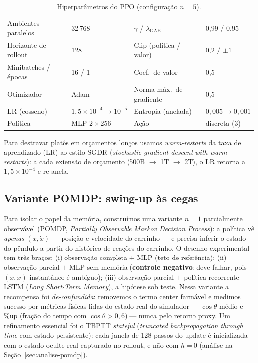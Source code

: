 \documentclass[12pt]{article}
\begin{document}
\begin{table}[ht]
\centering
\caption{Hiperparâmetros do PPO (configuração $n{=}5$).}
\label{tab:hparams}
\small
\begin{tabular}{ll@{\qquad}ll}
\toprule
Ambientes paralelos & 32\,768 & $\gamma$ / $\lambda_{\mathrm{GAE}}$ & 0,99 / 0,95\\
Horizonte de rollout & 128 & Clip (política / valor) & 0,2 / $\pm 1$\\
Minibatches / épocas & 16 / 1 & Coef.\ de valor & 0,5\\
Otimizador & Adam & Norma máx.\ de gradiente & 0,5\\
LR (cosseno) & $1{,}5\times10^{-4} \to 10^{-5}$ & Entropia (anelada) & $0{,}005 \to 0{,}001$\\
Política & MLP $2\times256$ & Ação & discreta (3)\\
\bottomrule
\end{tabular}
\end{table}

Para destravar platôs em orçamentos longos usamos \emph{warm-restarts} da taxa
de aprendizado (LR) ao estilo SGDR (\emph{stochastic gradient descent with
warm restarts}): a cada extensão de orçamento (500B $\to$ 1T $\to$ 2T), o LR
retorna a $1{,}5\times10^{-4}$ e re-anela.

\subsection{Variante POMDP: swing-up às cegas}\label{sec:pomdp-metodo}

Para isolar o papel da memória, construímos uma variante $n{=}1$ parcialmente
observável (POMDP, \emph{Partially Observable Markov Decision
Process}): a política vê \emph{apenas} $(x, \dot{x})$ --- posição e
velocidade do carrinho --- e precisa inferir o estado do pêndulo a partir do
histórico de reações do carrinho. O desenho experimental tem três braços:
(i) observação completa $+$ MLP (teto de referência); (ii) observação parcial
$+$ MLP sem memória (\textbf{controle negativo}: deve falhar, pois
$(x,\dot{x})$ instantâneo é ambíguo); (iii) observação parcial $+$ política
recorrente LSTM (\emph{Long Short-Term Memory}), a hipótese sob teste. Nessa variante a recompensa foi
\emph{de-confundida}: removemos o termo $\mathrm{center}$ farmável e medimos
sucesso por métricas físicas lidas do estado real do simulador ---
$\cos\theta$ médio e \%up (fração do tempo com $\cos\theta > 0{,}6$) --- nunca
pelo retorno proxy. Um refinamento essencial foi o TBPTT \emph{stateful}
(\emph{truncated backpropagation through time} com estado persistente): cada
janela de 128 passos do update é inicializada com o estado oculto real
capturado no rollout, e não com $h{=}0$ (análise na
Seção~\ref{sec:analise-pomdp}).
\end{document}
